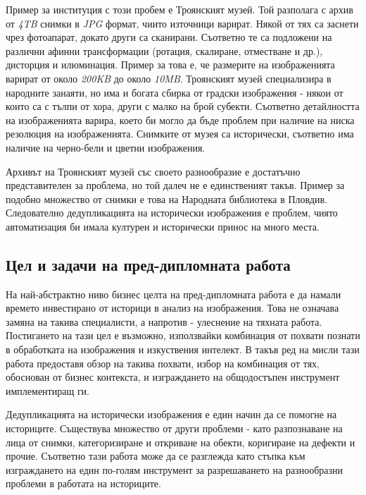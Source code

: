 \documentclass[a4paper,12pt]{article}
\begin{document}
\bigbreak

Пример за институция с този пробем е Троянският музей. Той разполага с архив от \textit{4TB} снимки в \textit{JPG} формат, чиито източници варират. Някой от тях са заснети чрез фотоапарат, докато други са сканирани. Съответно те са подложени на различни афинни трансформации (ротация, скалиране, отместване и др.), дисторция и илюминация. Пример за това е, че размерите на изображенията варират от около \textit{200KB} до около \textit{10MB}. Троянският музей специализира в народните занаяти, но има и богата сбирка от градски изображения - някои от които са с тълпи от хора, други с малко на брой субекти. Съответно детайлността на изображенията варира, което би могло да бъде проблем при наличие на ниска резолюция на изображенията. Снимките от музея са исторически, съответно има наличие на черно-бели и цветни изображения.

\bigbreak

Архивът на Троянският музей със своето разнообразие е достатъчно представителен за проблема, но той далеч не е единственият такъв. Пример за подобно множество от снимки е това на Народната библиотека в Пловдив. Следователно дедупликацията на исторически изображения е проблем, чиято автоматизация би имала културен и исторически принос на много места.

\subsection{Цел и задачи на пред-дипломната работа}

На най-абстрактно ниво бизнес целта на пред-дипломната работа е да намали времето инвестирано от историци в анализ на изображения. Това не означава замяна на такива специалисти, а напротив - улеснение на тяхната работа. Постигането на тази цел е възможно, използвайки комбинация от похвати познати в обработката на изображения и изкуствения интелект. В такъв ред на мисли тази работа предоставя обзор на такива похвати, избор на комбинация от тях, обоснован от бизнес контекста, и изграждането на общодостъпен инструмент имплементиращ ги.

\bigbreak

Дедупликацията на исторически изображения е един начин да се помогне на историците. Съществува множество от други проблеми - като разпознаване на лица от снимки, категоризиране и откриване на обекти, коригиране на дефекти и прочие. Съответно тази работа може да се разглежда като стъпка към изграждането на един по-голям инструмент за разрешаването на разнообразни проблеми в работата на историците.
\end{document}
